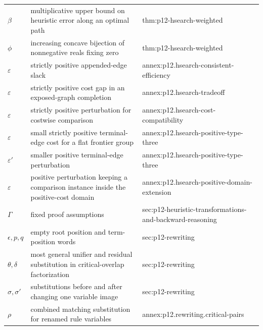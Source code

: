 \begin{longtable}{@{}p{}p{}p{}@{}}
\(\beta\) & multiplicative upper bound on heuristic error along an optimal path & thm:\allowbreak{}p12-\allowbreak{}hsearch-\allowbreak{}weighted \\
\(\phi\) & increasing concave bijection of nonnegative reals fixing zero & thm:\allowbreak{}p12-\allowbreak{}hsearch-\allowbreak{}weighted \\
\(\varepsilon\) & strictly positive appended-edge slack & annex:\allowbreak{}p12.\allowbreak{}hsearch-\allowbreak{}consistent-\allowbreak{}efficiency \\
\(\varepsilon\) & strictly positive cost gap in an exposed-graph completion & annex:\allowbreak{}p12.\allowbreak{}hsearch-\allowbreak{}tradeoff \\
\(\varepsilon\) & strictly positive perturbation for costwise comparison & annex:\allowbreak{}p12.\allowbreak{}hsearch-\allowbreak{}cost-\allowbreak{}compatibility \\
\(\varepsilon\) & small strictly positive terminal-edge cost for a flat frontier group & annex:\allowbreak{}p12.\allowbreak{}hsearch-\allowbreak{}positive-\allowbreak{}type-\allowbreak{}three \\
\(\varepsilon'\) & smaller positive terminal-edge perturbation & annex:\allowbreak{}p12.\allowbreak{}hsearch-\allowbreak{}positive-\allowbreak{}type-\allowbreak{}three \\
\(\varepsilon\) & positive perturbation keeping a comparison instance inside the positive-cost domain & annex:\allowbreak{}p12.\allowbreak{}hsearch-\allowbreak{}positive-\allowbreak{}domain-\allowbreak{}extension \\
\(\Gamma\) & fixed proof assumptions & sec:\allowbreak{}p12-\allowbreak{}heuristic-\allowbreak{}transformations-\allowbreak{}and-\allowbreak{}backward-\allowbreak{}reasoning \\
\(\epsilon,\allowbreak p,\allowbreak q\) & empty root position and term-position words & sec:\allowbreak{}p12-\allowbreak{}rewriting \\
\(\theta,\allowbreak \delta\) & most general unifier and residual substitution in critical-overlap factorization & sec:\allowbreak{}p12-\allowbreak{}rewriting \\
\(\sigma,\allowbreak \sigma'\) & substitutions before and after changing one variable image & sec:\allowbreak{}p12-\allowbreak{}rewriting \\
\(\rho\) & combined matching substitution for renamed rule variables & annex:\allowbreak{}p12.\allowbreak{}rewriting.\allowbreak{}critical-\allowbreak{}pairs \\

\end{longtable}
